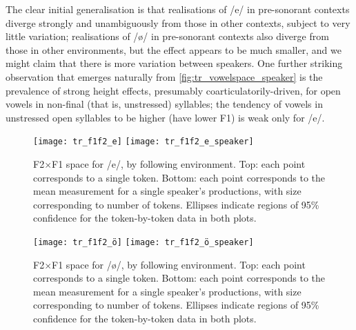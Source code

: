 The clear initial generalisation  is that realisations of /e/ in pre-sonorant contexts diverge strongly and unambiguously from those in other contexts, subject to very little variation; realisations of /ø/ in pre-sonorant contexts also diverge from those in other environments, but the effect appears to be much smaller, and we might claim that there is more variation between speakers. One further striking observation that emerges naturally from \cref{fig:tr_vowelspace_speaker} is the prevalence of strong height effects, presumably coarticulatorily-driven, for open vowels in non-final (that is, unstressed) syllables; the tendency of vowels in unstressed open syllables to be higher (have lower F1) is weak only for /e/.


%

\begin{figure}[ht]
  \centering
  \texttt{[image: tr\_f1f2\_e]}
    \texttt{[image: tr\_f1f2\_e\_speaker]}
  \caption[F2$\times$F1 space for /e/ alone by following environment.]{F2$\times$F1 space for /e/, by following environment. Top: each point corresponds to a single token. Bottom: each point corresponds to the mean measurement for a single speaker's productions, with size corresponding to number of tokens. Ellipses indicate regions of 95\% confidence for the token-by-token data in both plots.}
  \label{fig:tr_e}
\end{figure}

\begin{figure}[ht]
  \centering
  \texttt{[image: tr\_f1f2\_ö]}
    \texttt{[image: tr\_f1f2\_ö\_speaker]}
  \caption[F2$\times$F1 space for /\o/ alone by following environment.]{F2$\times$F1 space for /\o/, by following environment. Top: each point corresponds to a single token. Bottom: each point corresponds to the mean measurement for a single speaker's productions, with size corresponding to number of tokens. Ellipses indicate regions of 95\% confidence for the token-by-token data in both plots.}
  \label{fig:tr_ö}
\end{figure}


